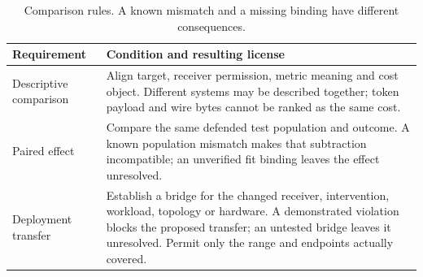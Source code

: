 \begin{table}[t]\centering\footnotesize
\caption{Comparison rules. A known mismatch and a missing binding have different consequences.}\label{tab:comparison-contracts}
\begin{tabularx}{\columnwidth}{@{}p{}Y@{}}\toprule
Requirement & Condition and resulting license\\\midrule
Descriptive comparison & Align target, receiver permission, metric meaning and cost object. Different systems may be described together; token payload and wire bytes cannot be ranked as the same cost.\\
Paired effect & Compare the same defended test population and outcome. A known population mismatch makes that subtraction incompatible; an unverified fit binding leaves the effect unresolved.\\
Deployment transfer & Establish a bridge for the changed receiver, intervention, workload, topology or hardware. A demonstrated violation blocks the proposed transfer; an untested bridge leaves it unresolved. Permit only the range and endpoints actually covered.\\\bottomrule
\end{tabularx}\end{table}
